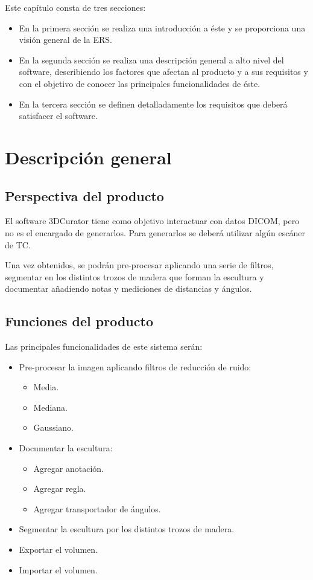 Este capítulo consta de tres secciones:
\begin{itemize}
	\item En la primera sección se realiza una introducción a éste y se proporciona una visión general de la ERS.
	\item En la segunda sección se realiza una descripción general a alto nivel del software, describiendo los factores que afectan al producto y a sus requisitos y con el objetivo de conocer las principales funcionalidades de éste.
	\item En la tercera sección se definen detalladamente los requisitos que deberá satisfacer el software.
\end{itemize}

\section{Descripción general}

\subsection{Perspectiva del producto}

El software 3DCurator tiene como objetivo interactuar con datos DICOM, pero no es el encargado de generarlos. Para generarlos se deberá utilizar algún escáner de TC.

Una vez obtenidos, se podrán pre-procesar aplicando una serie de filtros, segmentar en los distintos trozos de madera que forman la escultura y documentar añadiendo notas y mediciones de distancias y ángulos.

\subsection{Funciones del producto}

Las principales funcionalidades de este sistema serán:

\begin{itemize}
	\item Pre-procesar la imagen aplicando filtros de reducción de ruido:
	\begin{itemize}
		\item Media.
		\item Mediana.
		\item Gaussiano.
	\end{itemize}
	\item Documentar la escultura:
	\begin{itemize}
		\item Agregar anotación.
		\item Agregar regla.
		\item Agregar transportador de ángulos.
	\end{itemize}
	\item Segmentar la escultura por los distintos trozos de madera.
	\item Exportar el volumen.
	\item Importar el volumen.
\end{itemize}


